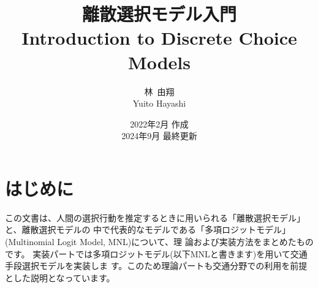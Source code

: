 \documentclass[a4paper,11pt,oneside,uplatex]{jsbook}
\title{{\huge 離散選択モデル入門}\\{\large Introduction to Discrete Choice Models} \\ 
$\,$\\$\,$\\$\,$\\$\,$\\$\,$\\$\,$\\$\,$\\}
\author{林~由翔\\Yuito Hayashi}
\date{2022年2月 作成 \\ 2024年9月 最終更新}
\theoremstyle{definition}
\begin{document}
\maketitle
\frontmatter
\chapter{はじめに}
この文書は、人間の選択行動を推定するときに用いられる「離散選択モデル」と、離散選択モデルの
中で代表的なモデルである「多項ロジットモデル」(Multinomial Logit Model, MNL)について、理
論および実装方法をまとめたものです。
実装パートでは多項ロジットモデル(以下MNLと書きます)を用いて交通手段選択モデルを実装しま
す。このため理論パートも交通分野での利用を前提とした説明となっています。

\setcounter{tocdepth}{2}
\tableofcontents

\mainmatter







\appendix


\backmatter


\end{document}
